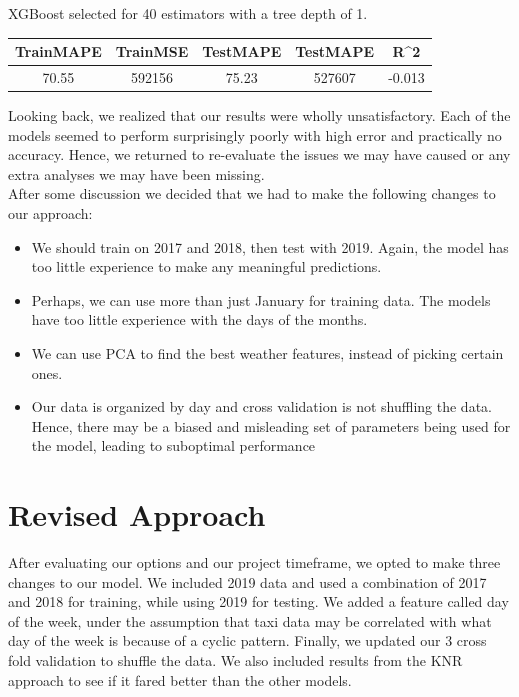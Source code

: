 \documentclass[journal, 12pt]{IEEEtran}
\begin{document}
\noindent XGBoost selected for 40 estimators with a tree depth of 1.\\


\begingroup
    \medskip
    \centering
    \def\arraystretch{1.5}
        \begin{tabular}{ccccc}
            \toprule
            TrainMAPE & TrainMSE & TestMAPE & TestMAPE & R^2 \\
            \midrule
            70.55 & 592156 & 75.23 & 527607 & -0.013\\
            \bottomrule
        \end{tabular}
    \label{table:fifty_runs}
    \medskip
\endgroup


\noindent Looking back, we realized that our results were wholly unsatisfactory. Each of the models seemed to perform surprisingly poorly with high error and practically no accuracy. Hence, we returned to re-evaluate the issues we may have caused or any extra analyses we may have been missing.\\

\noindent After some discussion we decided that we had to make the following changes to our approach: 

\begin{itemize}
  \item We should train on 2017 and 2018, then test with 2019. Again, the model has too little experience to make any meaningful predictions. 
  \item Perhaps, we can use more than just January for training data. The models have too little experience with the days of the months.
  \item We can use PCA to find the best weather features, instead of picking certain ones. 
  \item Our data is organized by day and cross validation is not shuffling the data. Hence, there may be a biased and misleading set of parameters being used for the model, leading to suboptimal performance
  
\end{itemize}

\section{Revised Approach}

\noindent After evaluating our options and our project timeframe, we opted to make three changes to our model. We included 2019 data and used a combination of 2017 and 2018 for training, while using 2019 for testing. We added a feature called day of the week, under the assumption that taxi data may be correlated with what day of the week is because of a cyclic pattern. Finally, we updated our 3 cross fold validation to shuffle the data. We also included results from the KNR approach to see if it fared better than the other models.\\
\end{document}
